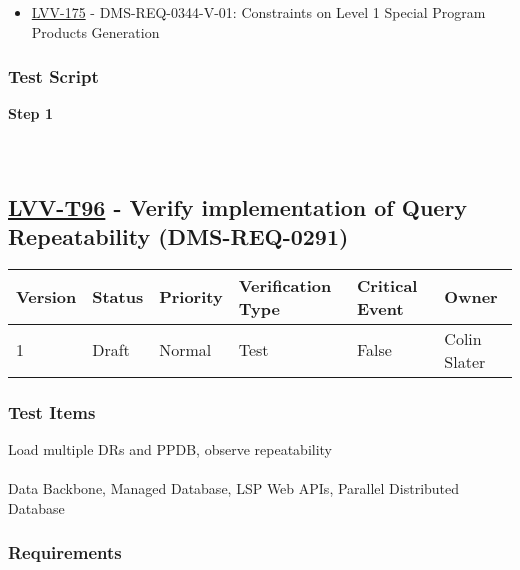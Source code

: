 \begin{itemize}
\tightlist
\item
  \href{https://jira.lsstcorp.org/browse/LVV-175}{LVV-175} -
  DMS-REQ-0344-V-01: Constraints on Level 1 Special Program Products
  Generation
\end{itemize}

\hypertarget{test-script-185}{%
\subsubsection{Test Script}\label{test-script-185}}

\textbf{Step 1}\\
~\\
~\\

\hypertarget{lvv-t96---verify-implementation-of-query-repeatability-dms-req-0291}{%
\subsection{\texorpdfstring{\href{https://jira.lsstcorp.org/secure/Tests.jspa\#/testCase/LVV-T96}{LVV-T96}
- Verify implementation of Query Repeatability
(DMS-REQ-0291)}{LVV-T96 - Verify implementation of Query Repeatability (DMS-REQ-0291)}}\label{lvv-t96---verify-implementation-of-query-repeatability-dms-req-0291}}

\begin{longtable}[]{@{}llllll@{}}
\toprule
Version & Status & Priority & Verification Type & Critical Event &
Owner\tabularnewline
\midrule
\endhead
1 & Draft & Normal & Test & False & Colin Slater\tabularnewline
\bottomrule
\end{longtable}

\hypertarget{test-items-185}{%
\subsubsection{Test Items}\label{test-items-185}}

Load multiple DRs and PPDB, observe repeatability\\
~\\
Data Backbone, Managed Database, LSP Web APIs, Parallel Distributed
Database

\hypertarget{requirements-186}{%
\subsubsection{Requirements}\label{requirements-186}}

